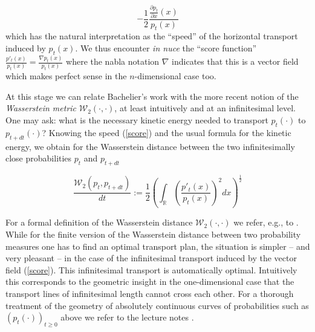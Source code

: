 \documentclass[11pt,a4paper]{article}%
\def\R{{\mathbb R}}
\numberwithin{equation}{section}
\begin{document}
 \begin{equation} \label{score}
 -\frac{1}{2} \frac{\frac{\partial p_{t}}{\partial x}(x)}{p_t(x)} 
\end{equation}
which has the natural interpretation as the ``speed'' of the horizontal  transport induced by $p_t(x)$. We thus encounter \textit{in nuce} the  ``score function'' $\frac{p'_t(x)}{p_t(x)} = \frac{\nabla p_t(x)}{p_t(x)}$ where the nabla notation $\nabla$ indicates that this is a vector field which makes perfect sense in the $n$-dimensional case too.

At this stage we can relate Bachelier's work with the more recent notion of the \textit{Wasserstein metric} $\mathcal{W}_2 (\cdot,\cdot)$, at least intuitively and at an infinitesimal level. One may ask: what is the necessary kinetic energy needed to transport $p_t(\cdot)$ to $p_{t+dt}(\cdot)$? Knowing the speed (\ref{score}) and the usual formula for the kinetic energy, we obtain for the Wasserstein distance between the two infinitesimally close probabilities $p_t$ and $p_{t+dt}$

\begin{equation}\label{Fisher}
 \frac{\mathcal{W}_2 \left(p_t,p_{t+dt}\right)}{dt} := \frac{1}{2} \left(\int_{\R} \left(\frac{p'_t(x)}{p_t(x)}\right)^2 dx \right)^{\frac{1}{2}}
\end{equation}

For a formal definition of the Wasserstein distance $\mathcal{W}_2 (\cdot,\cdot)$ we refer, e.g., to \cite{Vi09}. While for the finite version of the Wasserstein distance between two probability measures one has to find an optimal transport plan, the situation is simpler -- and very pleasant -- in the case of the infinitesimal transport induced by the vector field (\ref{score}). This infinitesimal transport is automatically optimal.
Intuitively this corresponds to the geometric insight in the one-dimensional case that the transport lines of infinitesimal length cannot cross each other. For a thorough treatment of the geometry of absolutely continuous curves of probabilities such as $\left(p_t(\cdot)\right)_{t \ge 0}$ above we refer to the lecture notes \cite{AmGiSa08}. 





\medskip
\end{document}
